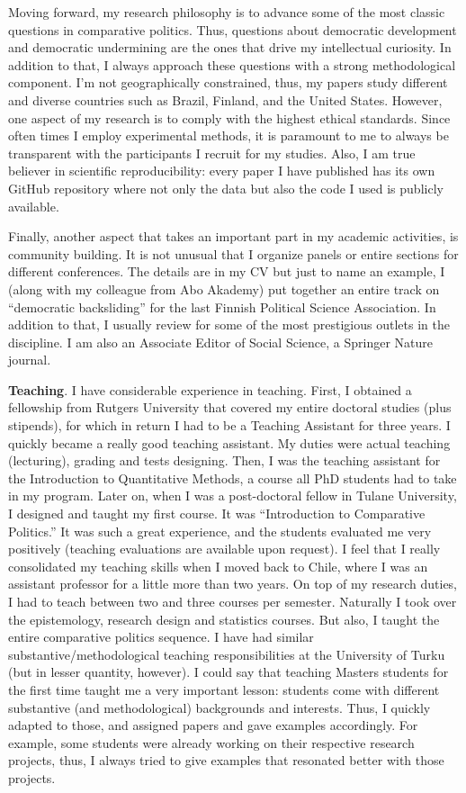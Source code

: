 \documentclass[10pt,stdletter,dateno,sigleft]{newlfm} %
\begin{document}
\begin{newlfm}
Moving forward, my research philosophy is to advance some of the most classic questions in comparative politics. Thus, questions about democratic development and democratic undermining are the ones that drive my intellectual curiosity. In addition to that, I always approach these questions with a strong methodological component. I'm not geographically constrained, thus, my papers study different and diverse countries such as Brazil, Finland, and the United States. However, one aspect of my research is to comply with the highest ethical standards. Since often times I employ experimental methods, it is paramount to me to always be transparent with the participants I recruit for my studies. Also, I am true believer in scientific reproducibility: every paper I have published has its own GitHub repository where not only the data but also the code I used is publicly available. 

Finally, another aspect that takes an important part in my academic activities, is community building. It is not unusual that I organize panels or entire sections for different conferences. The details are in my CV but just to name an example, I (along with my colleague from Abo Akademy) put together an entire track on ``democratic backsliding'' for the last Finnish Political Science Association. In addition to that, I usually review for some of the most prestigious outlets in the discipline. I am also an Associate Editor of Social Science, a Springer Nature journal.

{\bf Teaching}. I have considerable experience in teaching. First, I obtained a fellowship from Rutgers University that covered my entire doctoral studies (plus stipends), for which in return I had to be a Teaching Assistant for three years. I quickly became a really good teaching assistant. My duties were actual teaching (lecturing), grading and tests designing. Then, I was the teaching assistant for the Introduction to Quantitative Methods, a course all PhD students had to take in my program. Later on, when I was a post-doctoral fellow in Tulane University, I designed and taught my first course. It was ``Introduction to Comparative Politics.'' It was such a great experience, and the students evaluated me very positively (teaching evaluations are available upon request). I feel that I really consolidated my teaching skills when I moved back to Chile, where I was an assistant professor for a little more than two years. On top of my research duties, I had to teach between two and three courses per semester. Naturally I took over the epistemology, research design and statistics courses. But also, I taught the entire comparative politics sequence. I have had similar substantive/methodological teaching responsibilities at the University of Turku (but in lesser quantity, however). I could say that teaching Masters students for the first time taught me a very important lesson: students come with different substantive (and methodological) backgrounds and interests. Thus, I quickly adapted to those, and assigned papers and gave examples accordingly. For example, some students were already working on their respective research projects, thus, I always tried to give examples that resonated better with those projects.


\end{newlfm}
\end{document}

